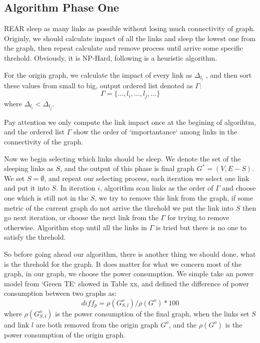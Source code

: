 \documentclass[conference]{IEEEtran}
\begin{document}
\subsection{Algorithm Phase One}
REAR sleep as many links as possible without losing much connectivity of graph. Originly,  we should
calculate impact of all the links and sleep the lowest one from the graph, then repeat calculate and remove
process until arrive some specific threhold. Obviously, it is NP-Hard, following is a heuristic algorithm.


For the origin graph, we calculate the impact of every link as $\Delta_{l_i}$ , and then sort these values
from small to big, output ordered list denoted as $\Gamma$: 
\begin{equation}
	\Gamma = \{..., l_i, ..., l_j, ...\}
\end{equation}
where $\Delta_{l_i} < \Delta_{l_j}$.


Pay attention we only compute the link impact once at the begining of algorihtm, and the ordered list $\Gamma$ show 
the order of `importantance` among links in the connectivity of the graph. 


Now we begin selecting which links should be sleep.
We denote the set of the sleeping links as $S$, and the output of this phase is final graph $G^* = (V, E-S)$. We set 
$S = \emptyset$, and repeat our selecting process, each iteration we select one link and put it into $S$. 
In iteration $i$, algorithm scan links as the order of $\Gamma$ and choose one which is still not in the $S$, we try to
remove this link from the graph, if some metric of the current graph do not arrive the threhold we put the link into
$S$ then go next iteration, or choose the next link from the $\Gamma$ for trying to remove otherwise. Algorithm
stop until all the links in $\Gamma$ is tried but there is no one to satisfy the threhold.


So before going ahead our algorithm, there is another thing we should done, what is the threhold for the graph.
It does matter for what we concern most of the graph, in our graph, we choose the power consumption. 
We simple take an power model from `Green TE` showed in Table xx, and defined the difference of power consumption 
between two graphs as:
\begin{equation}
	diff_p = \rho(G_{S, l}^o) / \rho(G^o) * 100
\end{equation}
where $\rho(G_{S, l}^o)$ is the power consumption of the final graph, when the links set $S$ and 
link $l$ are both removed from the origin graph $G^o$, and the $\rho(G^o)$ is the power consumption of 
the origin graph.
\end{document}
